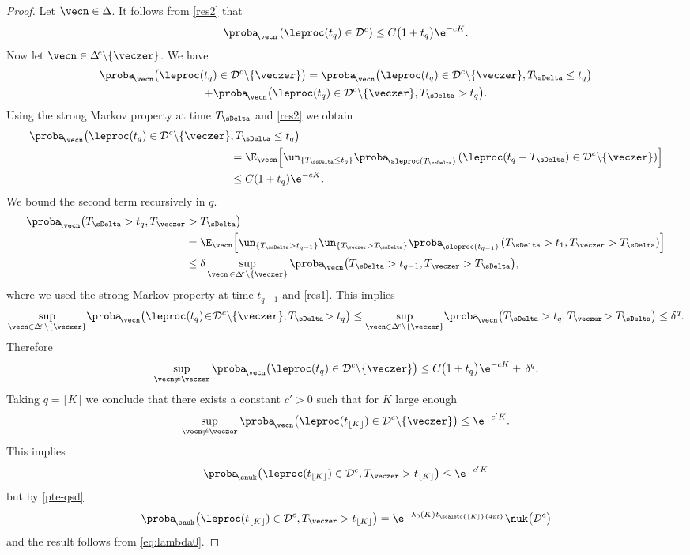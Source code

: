 \begin{proof}
Let $\vecn\in \Delta$. It follows from \eqref{res2} that
\[
\proba_{\!\vecn}\left(\leproc(t_q)\in \mathcal{D}^{c}\right)\le C\bigl(1+t_{q}\bigr)\e^{-cK}.
\]
Now let $\vecn\in \Delta^{\!c}\backslash\{\veczer\}$. We have
\begin{multline*}
\proba_{\!\vecn}\bigl(\leproc(t_q)\in \mathcal{D}^{c}\backslash \{\veczer\}\bigr)=
\proba_{\!\vecn}\bigl(\leproc(t_q)\in \mathcal{D}^{c}\backslash \{\veczer\},T_{\sDelta}\le t_{q}\bigr)\\
+
\proba_{\!\vecn}\bigl(\leproc(t_q)\in \mathcal{D}^{c}\backslash \{\veczer\},T_{\sDelta}>t_{q}\bigr).
\end{multline*}
Using the strong Markov property at time $T_{\sDelta}$ and \eqref{res2} we obtain
\begin{align*}
\proba_{\!\vecn}\bigl(\leproc(t_q)\in \mathcal{D}^{c}\backslash\{\veczer\}&,T_{\sDelta}\le t_{q}\bigr)\\
&= \E_{\vecn} \Bigl[\un_{\{T_{\ssDelta}\leq t_q\}} \proba_{\!\sleproc(T_{\ssDelta})}\left(\leproc(t_q-T_{\sDelta})\in \mathcal{D}^{c}\backslash \{\veczer\}\right)\Bigr]\\
& \leq C(1+t_q) \e^{-c K}.
\end{align*}
We bound the second term recursively in $q$.
\begin{align*}
\proba_{\!\vecn}\bigl(T_{\sDelta}>t_{q},T_{\veczer}&>T_{\sDelta}\bigr)\\
& = \E_{\vecn} \Bigl[\un_{\{T_{\ssDelta}>t_{q-1}\}} \un_{\{T_{\veczer}>T_{\ssDelta}\}}
\proba_{\!\sleproc(t_{q-1})}\left(T_{\sDelta}>t_1, T_{\veczer}>T_{\sDelta}\right)\Bigr]\\
& \leq \delta \sup_{\vecn\, \in \Delta^{\!c}\backslash \{\veczer\}}\proba_{\!\vecn}\bigl(T_{\sDelta}>t_{q-1},T_{\veczer}>T_{\sDelta}\bigr),
\end{align*}
where we used the strong Markov property at time $t_{q-1}$ and \eqref{res1}.
This implies
\[
\sup_{\vecn \in \Delta^{\!c}\backslash \{\veczer\}}\!\proba_{\!\vecn}\bigl(\leproc(t_q)\!\in\! \mathcal{D}^{c}
\backslash \{\veczer\},T_{\sDelta}\!>t_{q}\bigr)
\le
\sup_{\vecn \in \Delta^{\!c}\backslash \{\veczer\}} \!\proba_{\!\vecn}\bigl(T_{\sDelta}>t_{q},T_{\veczer}\!>T_{\sDelta}\bigr) \le \delta^{q}.
\]
Therefore
\[
\sup_{\vecn\neq\veczer}\proba_{\!\vecn}\bigl(\leproc(t_q)\in \mathcal{D}^{c}\backslash \{\veczer\}\bigr)\le
C\bigl(1+t_{q}\bigr)\e^{-c K}+\,\delta^{q}.
\]
Taking $q=\lfloor K \rfloor$ we conclude that there exists a constant $c'>0$ such that for $K$ large enough
\[
\sup_{\vecn\neq \veczer}\proba_{\!\vecn}\bigl(\leproc(t_{{ \lfloor K \rfloor}})\in \mathcal{D}^{c}
\backslash \{\veczer\}\bigr)\le\e^{-c' K}.
\]
This implies
\[
\proba_{\!\snuk}\bigl(\leproc(t_{{ \lfloor K \rfloor}})\in \mathcal{D}^{c},T_{\veczer}
>t_{{ \lfloor K \rfloor}}\bigr)\le \e^{-c' K}
\]
but by \eqref{pte-qsd}
\[
\proba_{\!\snuk}\bigl(\leproc(t_{{ \lfloor K \rfloor}})\in \mathcal{D}^{c},T_{\veczer}>t_{{ \lfloor K \rfloor}}\bigr)=
\e^{-\lambda_{0}(K)\hspace{.4pt} t_{\scaleto{\lfloor K \rfloor}{4pt}}}\nuk\bigl(\mathcal{D}^{c}\bigr)
\]
and the result follows from \eqref{eq:lambda0}.
\end{proof}

